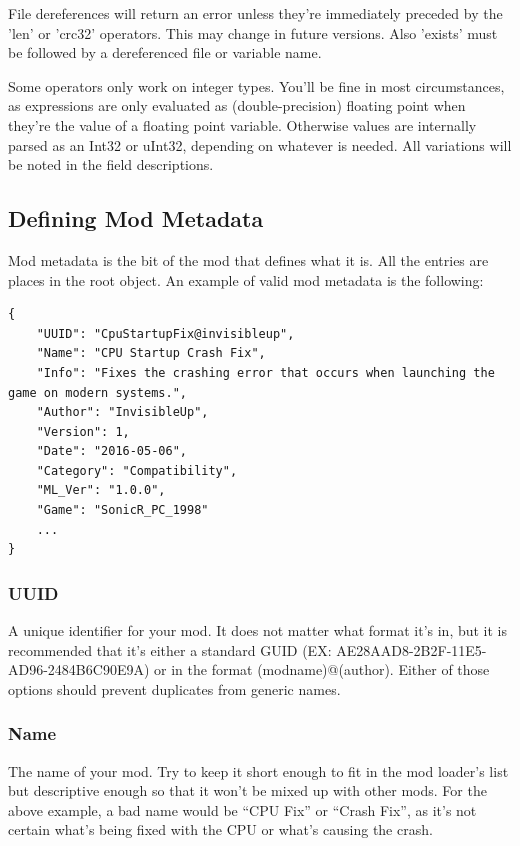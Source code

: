 \documentclass[12pt,a4paper,notitlepage]{article}
\begin{document}
File dereferences will return an error unless they're immediately preceded by the 'len' or 'crc32' operators. This may change in future versions. Also 'exists' must be followed by a dereferenced file or variable name.

Some operators only work on integer types. You'll be fine in most circumstances, as expressions are only evaluated as (double-precision) floating point when they're the value of a floating point variable. Otherwise values are internally parsed as an Int32 or uInt32, depending on whatever is needed. All variations will be noted in the field descriptions.

\subsection{Defining Mod Metadata}
\label{subsec:create-meta}
Mod metadata is the bit of the mod that defines what it is. All the entries are places in the root object. An example of valid mod metadata is the following:

\begin{lstlisting}[breaklines=true]
{
    "UUID": "CpuStartupFix@invisibleup",
    "Name": "CPU Startup Crash Fix",
    "Info": "Fixes the crashing error that occurs when launching the game on modern systems.",
    "Author": "InvisibleUp",
    "Version": 1,
    "Date": "2016-05-06",
    "Category": "Compatibility",
    "ML_Ver": "1.0.0",
    "Game": "SonicR_PC_1998"
    ...
}
\end{lstlisting}

\subsubsection{UUID}
\label{subsubsec:create-meta-uuid}
A unique identifier for your mod. It does not matter what format it's in, but it is recommended that it's either a standard GUID (EX: {AE28AAD8-2B2F-11E5-AD96-2484B6C90E9A}) or in the format (modname)@(author). Either of those options should prevent duplicates from generic names.

\subsubsection{Name}
\label{subsubsec:create-meta-name}
The name of your mod. Try to keep it short enough to fit in the mod loader's list but descriptive enough so that it won't be mixed up with other mods. For the above example, a bad name would be ``CPU Fix'' or ``Crash Fix'', as it's not certain what's being fixed with the CPU or what's causing the crash.
\end{document}
